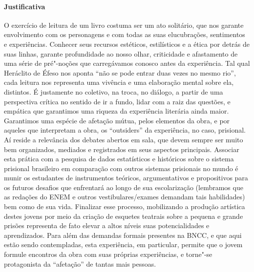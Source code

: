 \documentclass[11pt]{extarticle}
\begin{document}
\paragraph{Justificativa} O exercício de leitura de um livro costuma ser
um ato solitário, que nos garante envolvimento com os personagens e com
todas as suas elucubrações, sentimentos e experiências. Conhecer seus
recursos estéticos, estilísticos e a ética por detrás de suas linhas,
garante profundidade ao nosso olhar, criticidade e afastamento de uma
série de pré"-noções que carregávamos conosco antes da experiência. Tal
qual Heráclito de Éfeso nos aponta ``não se pode entrar duas vezes no
mesmo rio'', cada leitura nos representa uma vivência e uma elaboração
mental sobre ela, distintos. É justamente no coletivo, na troca, no
diálogo, a partir de uma perspectiva crítica no sentido de ir a fundo,
lidar com a raiz das questões, e empática que garantimos uma riqueza da
experiência literária ainda maior. Garantimos uma espécie de afetação
mútua, pelos elementos da obra, e por aqueles que interpretam a obra, os
``outsiders'' da experiência, no caso, prisional. Aí reside a relevância
dos debates abertos em sala, que devem sempre ser muito bem organizados,
mediados e registrados em seus aspectos principais. Associar esta
prática com a pesquisa de dados estatísticos e históricos sobre o
sistema prisional brasileiro em comparação com outros sistemas
prisionais no mundo é munir os estudantes de instrumentos teóricos,
argumentativos e propositivos para os futuros desafios que enfrentará ao
longo de sua escolarização (lembramos que as redações do ENEM e outros
vestibulares/exames demandam tais habilidades) bem como de sua vida.
Finalizar esse processo, mobilizando a produção artística destes jovens
por meio da criação de esquetes teatrais sobre a pequena e grande
prisões representa de fato elevar a altos níveis suas potencialidades e
aprendizados. Para além das demandas formais presentes na BNCC, e que
aqui estão sendo contempladas, esta experiência, em particular, permite
que o jovem formule encontros da obra com suas próprias experiências, e
torne"-se protagonista da ``afetação'' de tantas mais pessoas.
\end{document}
